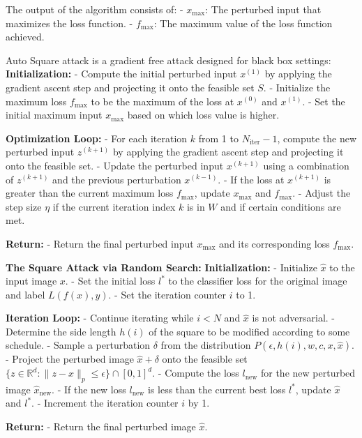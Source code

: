 The output of the algorithm consists of:
- $x_{\text{max}}$: The perturbed input that maximizes the loss function.
- $f_{\text{max}}$: The maximum value of the loss function achieved.

Auto Square attack is a gradient free attack designed for black box settings:
\textbf{Initialization:}
- Compute the initial perturbed input $x^{(1)}$ by applying the gradient ascent step and projecting it onto the feasible set $S$.
- Initialize the maximum loss $f_{\text{max}}$ to be the maximum of the loss at $x^{(0)}$ and $x^{(1)}$.
- Set the initial maximum input $x_{\text{max}}$ based on which loss value is higher.

\textbf{Optimization Loop:}
- For each iteration $k$ from 1 to $N_{\text{iter}} - 1$, compute the new perturbed input $z^{(k+1)}$ by applying the gradient ascent step and projecting it onto the feasible set.
- Update the perturbed input $x^{(k+1)}$ using a combination of $z^{(k+1)}$ and the previous perturbation $x^{(k-1)}$.
- If the loss at $x^{(k+1)}$ is greater than the current maximum loss $f_{\text{max}}$, update $x_{\text{max}}$ and $f_{\text{max}}$.
- Adjust the step size $\eta$ if the current iteration index $k$ is in $W$ and if certain conditions are met.

\textbf{Return:}
- Return the final perturbed input $x_{\text{max}}$ and its corresponding loss $f_{\text{max}}$.

\textbf{The Square Attack via Random Search:}
\textbf{Initialization:}
- Initialize $\hat{x}$ to the input image $x$.
- Set the initial loss $l^*$ to the classifier loss for the original image and label $L(f(x), y)$.
- Set the iteration counter $i$ to 1.

\textbf{Iteration Loop:}
- Continue iterating while $i < N$ and $\hat{x}$ is not adversarial.
- Determine the side length $h(i)$ of the square to be modified according to some schedule.
- Sample a perturbation $\delta$ from the distribution $P(\epsilon, h(i), w, c, x, \hat{x})$.
- Project the perturbed image $\hat{x} + \delta$ onto the feasible set $\{z \in \mathbb{R}^d : \|z - x\|_p \leq \epsilon\} \cap [0, 1]^d$.
- Compute the loss $l_{\text{new}}$ for the new perturbed image $\hat{x}_{\text{new}}$.
- If the new loss $l_{\text{new}}$ is less than the current best loss $l^*$, update $\hat{x}$ and $l^*$.
- Increment the iteration counter $i$ by 1.

\textbf{Return:}
- Return the final perturbed image $\hat{x}$.
